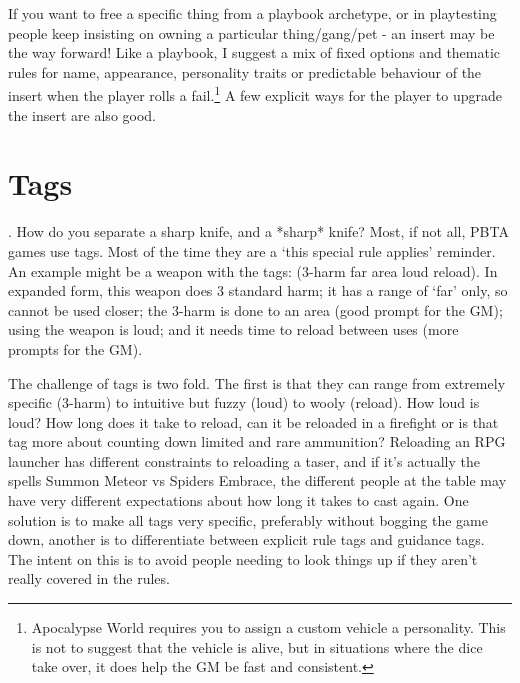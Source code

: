 \documentclass{tufte-handout}
\begin{document}
If you want to free a specific thing from a playbook archetype, or in playtesting people keep insisting on owning a particular thing/gang/pet -  an insert may be the way forward! 
Like a playbook, I suggest a mix of fixed options and thematic rules for name, appearance, personality traits or predictable behaviour of the insert when the player rolls a fail.\footnote{Apocalypse World requires you to assign a custom vehicle a personality. This is not to suggest that the vehicle is alive, but in situations where the dice take over, it does help the GM be fast and consistent.}  A few explicit ways for the player to upgrade the insert are also good. 

\section{Tags}.
How do you separate a sharp knife, and a *sharp* knife? Most, if not all, PBTA games use tags. Most of the time they are a `this special rule applies' reminder. An example might be a weapon with the tags: (3-harm far area loud reload). In expanded form, this weapon does 3 standard harm; it has a range of `far' only, so cannot be used closer; the 3-harm is done to an area (good prompt for the GM); using the weapon is loud; and it needs time to reload between uses (more prompts for the GM).  

The challenge of tags is two fold. The first is that they can range from extremely specific (3-harm) to intuitive but fuzzy (loud) to wooly (reload). How loud is loud? How long does it take to reload, can it be reloaded in a firefight or is that tag more about counting down limited and rare ammunition? Reloading an RPG launcher has different constraints to reloading a taser, and if it's actually the spells Summon Meteor vs Spiders Embrace, the different people at the table may have very different expectations about how long it takes to cast again. One solution is to make all tags very specific, preferably without bogging the game down, another is to differentiate between explicit rule tags and guidance tags. The intent on this is to avoid people needing to look things up if they aren't really covered in the rules. 
\end{document}
